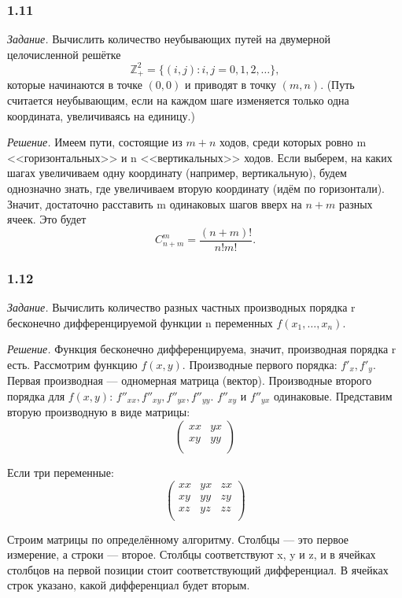 \documentclass{book}
\begin{document}
\subsubsection*{1.11}

\textit{Задание.} Вычислить количество неубывающих путей на двумерной целочисленной решётке
$$ \mathbb{Z}_+^2 = \{ \left( i, j \right): i, j = 0, 1, 2,  \dotsc \},$$
которые начинаются в точке $ \left( 0, 0 \right) $ и приводят в точку $ \left( m, n \right) $.
(Путь считается неубывающим, если на каждом шаге изменяется только одна координата, увеличиваясь на единицу.)

\textit{Решение.} Имеем пути, состоящие из $m+n$ ходов, среди которых ровно m <<горизонтальных>> и n <<вертикальных>> ходов.
Если выберем, на каких шагах увеличиваем одну координату (например, вертикальную), будем однозначно знать, где увеличиваем вторую координату (идём по горизонтали).
Значит, достаточно расставить m одинаковых шагов вверх на $n+m$ разных ячеек.
Это будет $$ C_{n+m}^m = \frac{ \left( n+m \right)!}{n!m!}.$$

\subsubsection*{1.12}

\textit{Задание.} Вычислить количество разных частных производных порядка r бесконечно дифференцируемой функции n переменных $f\left(x_1,  \dotsc , x_n\right)$.

\textit{Решение.} Функция бесконечно дифференцируема, значит, производная порядка r есть.
Рассмотрим функцию $f(x, y)$.
Производные первого порядка: $f'_x, f'_y$.
Первая производная --- одномерная матрица (вектор).
Производные второго порядка для
$f(x, y)$: $f''_{xx}, f''_{xy}, f''_{yx}, f''_{yy}$. $f''_{xy}$ и $f''_{yx}$
одинаковые.
Представим вторую производную в виде матрицы:
$$
\begin{pmatrix}
  xx & yx \\
  xy & yy \\ 
\end{pmatrix}
$$

Если три переменные:
$$
\begin{pmatrix}
  xx & yx & zx \\
  xy & yy & zy \\
  xz & yz & zz \\ 
\end{pmatrix}
$$

Строим матрицы по определённому алгоритму.
Столбцы --- это первое измерение, а строки --- второе.
Столбцы соответствуют x, y и z, и в ячейках столбцов на первой позиции стоит соответствующий дифференциал.
В ячейках строк указано, какой дифференциал будет вторым.
\end{document}

